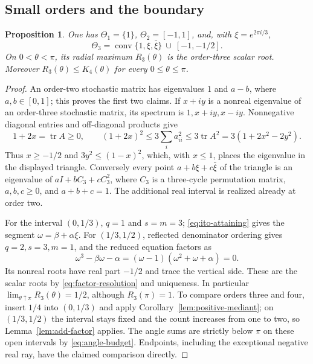 \documentclass[11pt,a4paper]{article}
\newtheorem{proposition}[theorem]{Proposition}
\theoremstyle{definition}
\theoremstyle{remark}
\numberwithin{equation}{section}
\begin{document}
\subsection{Small orders and the boundary}
\begin{proposition}\label{prop:low-orders}
One has $\Theta_1=\{1\}$, $\Theta_2=[-1,1]$, and, with $\xi=e^{2\pi i/3}$,
\begin{equation}\label{eq:order-three}
 \Theta_3=\operatorname{conv}\{1,\xi,\bar\xi\}\ \cup\ [-1,-1/2].
\end{equation}
On $0<\theta<\pi$, its radial maximum $R_3(\theta)$ is the order-three scalar root.
Moreover $R_3(\theta)\le K_4(\theta)$ for every $0\le\theta\le\pi$.
\end{proposition}
\begin{proof}
An order-two stochastic matrix has eigenvalues $1$ and $a-b$, where $a,b\in[0,1]$; this proves the first two claims.
If $x+iy$ is a nonreal eigenvalue of an order-three stochastic matrix, its spectrum is $1,x+iy,x-iy$.
Nonnegative diagonal entries and off-diagonal products give
\[
 1+2x=\operatorname{tr}A\ge0,\qquad
 (1+2x)^2\le3\sum_i a_{ii}^2\le3\operatorname{tr}A^2
       =3(1+2x^2-2y^2).
\]
Thus $x\ge-1/2$ and $3y^2\le(1-x)^2$, which, with $x\le1$, places the eigenvalue in the displayed triangle.
Conversely every point $a+b\xi+c\bar\xi$ of the triangle is an eigenvalue of
$aI+bC_3+cC_3^2$, where $C_3$ is a three-cycle permutation matrix,
$a,b,c\ge0$, and $a+b+c=1$.
The additional real interval is realized already at order two.

For the interval $(0,1/3)$, $q=1$ and $s=m=3$; \eqref{eq:ito-attaining} gives the segment $\omega=\beta+\alpha\xi$.
For $(1/3,1/2)$, reflected denominator ordering gives $q=2,s=3,m=1$, and the reduced equation factors as
\[
 \omega^3-\beta\omega-\alpha
   =(\omega-1)(\omega^2+\omega+\alpha)=0.
\]
Its nonreal roots have real part $-1/2$ and trace the vertical side.
These are the scalar roots by \eqref{eq:factor-resolution} and uniqueness.
In particular $\lim_{\theta\uparrow\pi}R_3(\theta)=1/2$, although $R_3(\pi)=1$.
To compare orders three and four, insert $1/4$ into $(0,1/3)$ and apply Corollary~\ref{lem:positive-mediant}; on $(1/3,1/2)$ the interval stays fixed and the count increases from one to two, so Lemma~\ref{lem:add-factor} applies.
The angle sums are strictly below $\pi$ on these open intervals by \eqref{eq:angle-budget}.
Endpoints, including the exceptional negative real ray, have the claimed comparison directly.
\end{proof}
\end{document}
